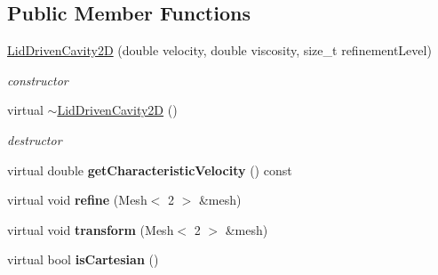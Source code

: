 \subsection*{Public Member Functions}
\begin{DoxyCompactItemize}
\item 
\hyperlink{classnatrium_1_1LidDrivenCavity2D_a139fe700f3e871e1b51eada1a41c69b1}{LidDrivenCavity2D} (double velocity, double viscosity, size\_\-t refinementLevel)
\begin{DoxyCompactList}\small\item\em constructor \item\end{DoxyCompactList}\item 
\hypertarget{classnatrium_1_1LidDrivenCavity2D_a8ae5029b008eb3d3c810bae81440b29c}{
virtual \hyperlink{classnatrium_1_1LidDrivenCavity2D_a8ae5029b008eb3d3c810bae81440b29c}{$\sim$LidDrivenCavity2D} ()}
\label{classnatrium_1_1LidDrivenCavity2D_a8ae5029b008eb3d3c810bae81440b29c}

\begin{DoxyCompactList}\small\item\em destructor \item\end{DoxyCompactList}\item 
\hypertarget{classnatrium_1_1LidDrivenCavity2D_a82c2d453cd5dd83f09a438201a7adec6}{
virtual double {\bfseries getCharacteristicVelocity} () const }
\label{classnatrium_1_1LidDrivenCavity2D_a82c2d453cd5dd83f09a438201a7adec6}

\item 
\hypertarget{classnatrium_1_1LidDrivenCavity2D_a1899d1f52f6f0e25f6be7dff5746efb9}{
virtual void {\bfseries refine} (Mesh$<$ 2 $>$ \&mesh)}
\label{classnatrium_1_1LidDrivenCavity2D_a1899d1f52f6f0e25f6be7dff5746efb9}

\item 
\hypertarget{classnatrium_1_1LidDrivenCavity2D_af42aefb1a7b763f7b0cca834038b5290}{
virtual void {\bfseries transform} (Mesh$<$ 2 $>$ \&mesh)}
\label{classnatrium_1_1LidDrivenCavity2D_af42aefb1a7b763f7b0cca834038b5290}

\item 
\hypertarget{classnatrium_1_1LidDrivenCavity2D_ac3267518c1364106da978b8d169c97d1}{
virtual bool {\bfseries isCartesian} ()}
\label{classnatrium_1_1LidDrivenCavity2D_ac3267518c1364106da978b8d169c97d1}

\end{DoxyCompactItemize}


